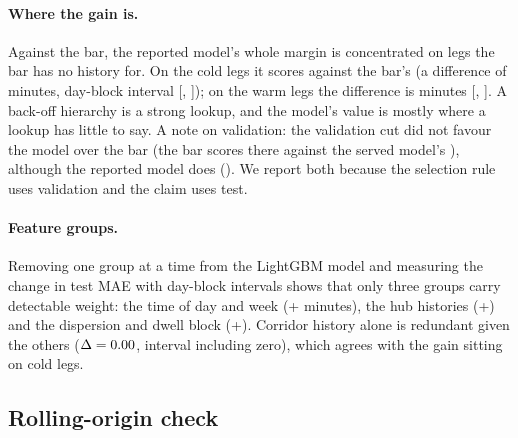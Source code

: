 \paragraph{Where the gain is.} Against the bar, the reported model's whole margin is concentrated on legs the bar has no history for. On the \fzColdLegsTest{} cold legs it scores \fzReportedColdMaeDpOne{} against the bar's \fzColdMaeBackoffDpOne{} (a difference of \fzReportedColdDeltaDpOne{} minutes, day-block interval [\fzReportedColdCiLowDpOne{}, \fzReportedColdCiHighDpOne{}]); on the warm legs the difference is \fzReportedWarmDeltaDpTwo{} minutes [\fzReportedWarmCiLowDpTwo{}, \fzReportedWarmCiHighDpTwo{}]. A back-off hierarchy is a strong lookup, and the model's value is mostly where a lookup has little to say. A note on validation: the validation cut did not favour the model over the bar (the bar scores \fzBarBackoffValidationMaeDpTwo{} there against the served model's \fzVTwoValidationMaeDpTwo{}), although the reported model does (\fzReportedValidationMaeDpTwo{}). We report both because the selection rule uses validation and the claim uses test.

\ifjournal
\paragraph{Feature groups.} Removing one group at a time from the LightGBM model and measuring the change in test MAE with day-block intervals shows that only three groups carry detectable weight: the time of day and week (+\fzAblationTimeDeltaDpTwo{} minutes), the hub histories (+\fzAblationHubDeltaDpTwo{}) and the dispersion and dwell block (+\fzAblationDispersionDeltaDpTwo{}). Corridor history alone is redundant given the others ($\Delta=0.00{}$, interval including zero), which agrees with the gain sitting on cold legs.
\fi

\subsection{Rolling-origin check}\label{sec:rolling}


